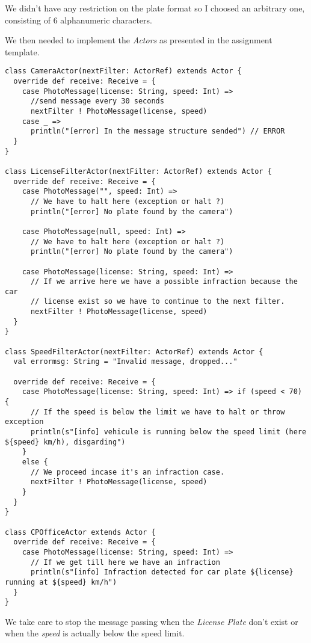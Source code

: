 \documentclass[a4paper,11pt]{article}
\begin{document}
We didn't have any restriction on the plate format so I choosed an arbitrary one,
consisting of 6 alphanumeric characters.

We then needed to implement the \emph{Actors} as presented in the assignment
template.

\begin{lstlisting}[style=scala]
class CameraActor(nextFilter: ActorRef) extends Actor {
  override def receive: Receive = {
    case PhotoMessage(license: String, speed: Int) =>
      //send message every 30 seconds
      nextFilter ! PhotoMessage(license, speed)
    case _ =>
      println("[error] In the message structure sended") // ERROR
  }
}

class LicenseFilterActor(nextFilter: ActorRef) extends Actor {
  override def receive: Receive = {
    case PhotoMessage("", speed: Int) =>
      // We have to halt here (exception or halt ?)
      println("[error] No plate found by the camera")

    case PhotoMessage(null, speed: Int) =>
      // We have to halt here (exception or halt ?)
      println("[error] No plate found by the camera")

    case PhotoMessage(license: String, speed: Int) =>
      // If we arrive here we have a possible infraction because the car
      // license exist so we have to continue to the next filter.
      nextFilter ! PhotoMessage(license, speed)
  }
}

class SpeedFilterActor(nextFilter: ActorRef) extends Actor {
  val errormsg: String = "Invalid message, dropped..."

  override def receive: Receive = {
    case PhotoMessage(license: String, speed: Int) => if (speed < 70) {
      // If the speed is below the limit we have to halt or throw exception
      println(s"[info] vehicule is running below the speed limit (here ${speed} km/h), disgarding")
    }
    else {
      // We proceed incase it's an infraction case.
      nextFilter ! PhotoMessage(license, speed)
    }
  }
}

class CPOfficeActor extends Actor {
  override def receive: Receive = {
    case PhotoMessage(license: String, speed: Int) =>
      // If we get till here we have an infraction
      println(s"[info] Infraction detected for car plate ${license} running at ${speed} km/h")
  }
}
\end{lstlisting}

We take care to stop the message passing when the \emph{License Plate} don't exist
or when the \emph{speed} is actually below the speed limit.
\end{document}

